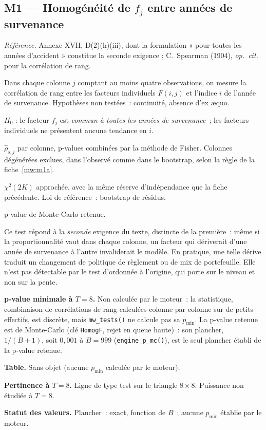 \documentclass[a4paper,11pt]{article}
\newcommand{\code}[1]{\texttt{\small #1}}
\newcommand{\refl}[1]{{\small\textcolor{maincolor!70!black}{\textit{Référence.} #1}}\par\smallskip}
\newcounter{ficheid}
\newenvironment{fiche}[1]{%
  \stepcounter{ficheid}%
  \phantomsection
  \subsection{#1}%
  \label{fiche:\theficheid}%
}{%
  \end{description}\vspace{0.5em}%
}
\newcommand{\Cadre}{%
  \begin{description}[leftmargin=0pt, style=unboxed, itemsep=3pt, topsep=3pt, parsep=2pt]%
  \item[\textcolor{financeblue}{\textbf{1. Cadre, notations et hypothèses de validité (non testées).}}]}
\newcommand{\Hzero}{\item[\textcolor{financeblue}{\textbf{2. Hypothèse nulle.}}]}
\newcommand{\Stat}{\item[\textcolor{financeblue}{\textbf{3. Statistique de test.}}]}
\newcommand{\Loi}{\item[\textcolor{financeblue}{\textbf{4. Loi sous $H_0$.}}]}
\newcommand{\Pval}{\item[\textcolor{financeblue}{\textbf{5. p-value.}}]}
\newcommand{\Usage}{\item[\textcolor{financeblue}{\textbf{6. Usage et limites.}}]}
\newcommand{\Pertinence}{\item[\textcolor{financeblue}{\textbf{7. Pertinence et puissance à faible $T$.}}]}
\begin{document}
\begin{fiche}{M1 --- Homogénéité de $f_j$ entre années de survenance}
\label{mw:m1b}
\refl{Annexe XVII, D(2)(h)(iii), dont la formulation « pour toutes les années
d'accident » constitue la seconde exigence ; C.~Spearman (1904),
\emph{op.\ cit.} pour la corrélation de rang.}
\Cadre
Dans chaque colonne $j$ comptant au moins quatre observations, on mesure la
corrélation de rang entre les facteurs individuels $F(i,j)$ et l'indice $i$ de
l'année de survenance. Hypothèses non testées~: continuité, absence d'ex
\ae quo.
\Hzero
$H_0$ : le facteur $f_j$ est \emph{commun à toutes les années de survenance}~;
les facteurs individuels ne présentent aucune tendance en $i$.
\Stat
$\hat\rho_{s,j}$ par colonne, p-values combinées par la méthode de Fisher. Colonnes
dégénérées exclues, dans l'observé comme dans le bootstrap, selon la règle de la
fiche~\ref{mw:m1a}.
\Loi
$\chi^2(2K)$ approchée, avec la même réserve d'indépendance que la fiche
précédente. Loi de référence~: bootstrap de résidus.
\Pval
p-value de Monte-Carlo retenue.
\Usage
Ce test répond à la \emph{seconde} exigence du texte, distincte de la première~:
même si la proportionnalité vaut dans chaque colonne, un facteur qui dériverait
d'une année de survenance à l'autre invaliderait le modèle. En pratique, une
telle dérive traduit un changement de politique de règlement ou de mix de
portefeuille. Elle n'est pas détectable par le test d'ordonnée à l'origine, qui
porte sur le niveau et non sur la pente.
\Pertinence
\textbf{p-value minimale à $T = 8$.} Non calculée par le moteur~: la statistique, combinaison de corrélations de rang calculées colonne par colonne sur de petits effectifs, est discrète, mais \code{mw\_tests()} ne calcule pas sa $p_{\min}$. La p-value retenue est de Monte-Carlo (clé \code{HomogF}, rejet en queue haute)~: son plancher, $1/(B+1)$, soit $0{,}001$ à $B = 999$ (\code{engine\_p\_mc()}), est le seul plancher établi de la p-value retenue.

\textbf{Table.} Sans objet (aucune $p_{\min}$ calculée par le moteur).

\textbf{Pertinence à $T = 8$.} Ligne de type test sur le triangle $8\times 8$. Puissance non étudiée à $T = 8$.

\textbf{Statut des valeurs.} Plancher~: exact, fonction de $B$~; aucune $p_{\min}$ établie par le moteur.
\end{fiche}
\end{document}
